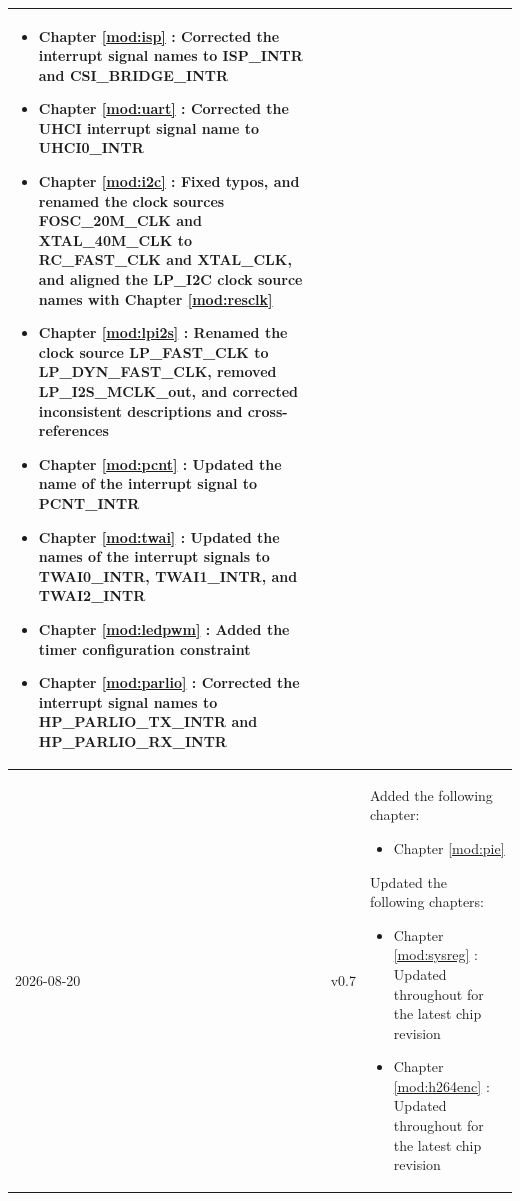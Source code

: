 \begin{longtable}[l]{ | m{2cm} | m{1.5cm} | m{12cm} | }
\begin{itemize}
        \item Chapter \ref{mod:isp} \textit{\nameref{mod:isp}}: Corrected the interrupt signal names to ISP\_INTR and CSI\_BRIDGE\_INTR %
        \item Chapter \ref{mod:uart} \textit{\nameref{mod:uart}}: Corrected the UHCI interrupt signal name to UHCI0\_INTR %
        \item Chapter \ref{mod:i2c} \textit{\nameref{mod:i2c}}: Fixed typos, and renamed the clock sources FOSC\_20M\_CLK and XTAL\_40M\_CLK to RC\_FAST\_CLK and XTAL\_CLK, and aligned the LP\_I2C clock source names with Chapter \ref{mod:resclk} \textit{\nameref{mod:resclk}} %
        \item Chapter \ref{mod:lpi2s} \textit{\nameref{mod:lpi2s}}: Renamed the clock source LP\_FAST\_CLK to LP\_DYN\_FAST\_CLK, removed LP\_I2S\_MCLK\_out, and corrected inconsistent descriptions and cross-references %
        \item Chapter \ref{mod:pcnt} \textit{\nameref{mod:pcnt}}: Updated the name of the interrupt signal to PCNT\_INTR
        \item Chapter \ref{mod:twai} \textit{\nameref{mod:twai}}: Updated the names of the interrupt signals to TWAI0\_INTR, TWAI1\_INTR, and TWAI2\_INTR %
        \item Chapter \ref{mod:ledpwm} \textit{\nameref{mod:ledpwm}}: Added the timer configuration constraint %
        \item Chapter \ref{mod:parlio} \textit{\nameref{mod:parlio}}: Corrected the interrupt signal names to HP\_PARLIO\_TX\_INTR and HP\_PARLIO\_RX\_INTR %
    \end{itemize}
    \\\hline
    2026-08-20 & v0.7 & Added the following chapter:
    \begin{itemize}
        \item Chapter \ref{mod:pie} \textit{\nameref{mod:pie}}
    \end{itemize}
    Updated the following chapters:
    \begin{itemize}
        \item Chapter \ref{mod:sysreg} \textit{\nameref{mod:sysreg}}: Updated throughout for the latest chip revision
        \item Chapter \ref{mod:h264enc} \textit{\nameref{mod:h264enc}}: Updated throughout for the latest chip revision
    \end{itemize}


\end{longtable}
